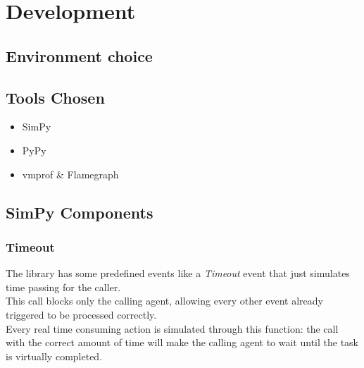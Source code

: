 
\section{Development}

\subsection{Environment choice}

\subsection{Tools Chosen}
\begin{itemize}
    \item SimPy
    \item PyPy
    \item vmprof \& Flamegraph
\end{itemize}

\subsection{SimPy Components}
\subsubsection*{Timeout}
The library has some predefined events like a \textit{Timeout} event that just
simulates time passing for the caller.\\
This call blocks only the calling agent, allowing every other event already
triggered to be processed correctly. \\
Every real time consuming action is simulated through this function: the call
with the correct amount of time will make the calling agent to wait until the
task is virtually completed.

